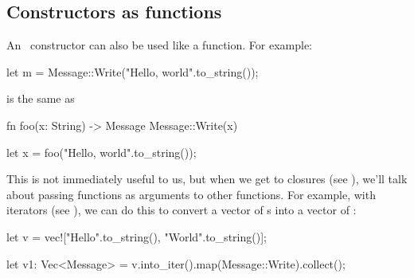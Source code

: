 \subsection*{Constructors as functions}

An \enum\ constructor can also be used like a function. For example:

\begin{rustc}
let m = Message::Write("Hello, world".to_string());
\end{rustc}

is the same as

\begin{rustc}
fn foo(x: String) -> Message {
    Message::Write(x)
}

let x = foo("Hello, world".to_string());
\end{rustc}

This is not immediately useful to us, but when we get to closures (see ), we'll talk about passing 
functions as arguments to other functions. For example, with iterators (see ), we can do this to 
convert a vector of \String s into a vector of :

\begin{rustc}
let v = vec!["Hello".to_string(), "World".to_string()];

let v1: Vec<Message> = v.into_iter().map(Message::Write).collect();
\end{rustc}
